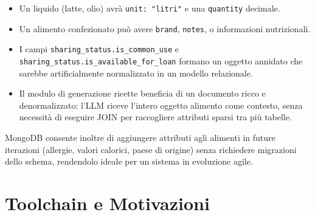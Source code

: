 \documentclass[12pt,a4paper,twoside]{report}
\begin{document}
\begin{itemize}
  \item Un liquido (latte, olio) avrà \texttt{unit: "litri"} e una \texttt{quantity} decimale.
  \item Un alimento confezionato può avere \texttt{brand}, \texttt{notes}, o informazioni nutrizionali.
  \item I campi \texttt{sharing\_status.is\_common\_use} e \texttt{sharing\_status.is\_available\_for\_loan} formano un oggetto annidato che sarebbe artificialmente normalizzato in un modello relazionale.
  \item Il modulo di generazione ricette beneficia di un documento ricco e denormalizzato: l'LLM riceve l'intero oggetto alimento come contesto, senza necessità di eseguire JOIN per raccogliere attributi sparsi tra più tabelle.
\end{itemize}

MongoDB consente inoltre di aggiungere attributi agli alimenti in future iterazioni (allergie, valori calorici, paese di origine) senza richiedere migrazioni dello schema, rendendolo ideale per un sistema in evoluzione agile.

\section{Toolchain e Motivazioni}
\end{document}
